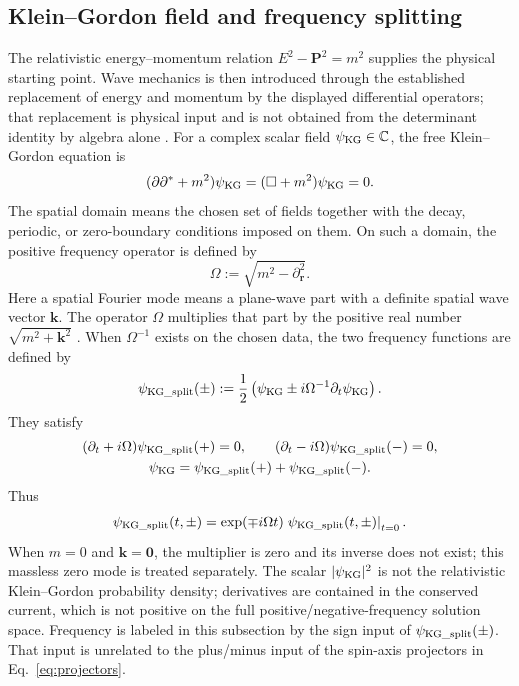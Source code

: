 \documentclass[10pt,letterpaper]{article}
\let\STAamsmathtext\text
\newcommand{\eqtext}[1]{\STAamsmathtext{\normalfont\rmfamily #1}}
\renewcommand{\text}[1]{\STAamsmathtext{\normalfont\rmfamily #1}}
\newcommand{\C}{\mathbb{C}}
\newcommand{\pv}[1]{#1}
\newcommand{\vct}[1]{\mathbf{#1}}
\newcommand{\delop}{\partial}
\newcommand{\delr}{\delop_{\vct{r}}}
\newcommand{\gradv}{\delr}
\newcommand{\conj}[1]{#1^{*}}
\begin{document}
\subsection{Klein--Gordon field and frequency splitting}
The relativistic energy--momentum relation
\(E^2-\vct{P}^2=m^2\) supplies the physical starting point. Wave mechanics is
then introduced through the established replacement of energy and momentum
by the displayed differential operators; that replacement is physical input
and is not obtained from the determinant identity by algebra alone
\cite{klein1926,gordon1926,greiner2000}. For a complex scalar field
\(\psi_{\eqtext{KG}}\in\C\), the free Klein--Gordon equation is
\begin{equation}
(\pv{\partial}\conj{\pv{\partial}}+m^2)\psi_{\eqtext{KG}}
=(\Box+m^2)\psi_{\eqtext{KG}}=0.
\label{eq:kg-free}
\end{equation}
The spatial domain means the chosen set of fields together with the decay,
periodic, or zero-boundary conditions imposed on them. On such a domain, the
positive frequency operator is defined by
\begin{equation}
\Omega:=\sqrt{m^2-\gradv^2}.
\label{eq:frequency-operator}
\end{equation}
Here a spatial Fourier mode means a plane-wave part with a definite spatial
wave vector \(\vct{k}\). The operator \(\Omega\) multiplies that part by the
positive real number \(\sqrt{m^2+\vct{k}^2}\)
\cite{greiner2000}. When \(\Omega^{-1}\) exists
on the chosen data,
the two frequency functions are defined by
\begin{equation}
\psi_{\eqtext{KG\_split}}(\pm)
:=\frac12\left(
\psi_{\eqtext{KG}}\pm
i\Omega^{-1}\partial_t\psi_{\eqtext{KG}}
\right).
\label{eq:frequency-functions}
\end{equation}
They satisfy
\begin{equation}
\begin{gathered}
(\partial_t+i\Omega)\psi_{\eqtext{KG\_split}}(+)=0,\qquad
(\partial_t-i\Omega)\psi_{\eqtext{KG\_split}}(-)=0,\\
\psi_{\eqtext{KG}}
=\psi_{\eqtext{KG\_split}}(+)+\psi_{\eqtext{KG\_split}}(-).
\end{gathered}
\label{eq:frequency-split}
\end{equation}
Thus
\[
\psi_{\eqtext{KG\_split}}(t,\pm)
=\exp(\mp i\Omega t)
\left.\psi_{\eqtext{KG\_split}}(t,\pm)\right|_{t=0}.
\]
When \(m=0\) and \(\vct{k}=\vct{0}\), the multiplier is zero and its inverse
does not exist; this massless zero mode is treated separately. The scalar
\(\lvert\psi_{\eqtext{KG}}\rvert^2\) is not the relativistic
Klein--Gordon probability density;
derivatives are contained in the conserved current, which is not positive on
the full positive/negative-frequency solution space.
Frequency is labeled in this subsection by the sign input of
\(\psi_{\eqtext{KG\_split}}(\pm)\). That input is unrelated to the
plus/minus input of the spin-axis projectors in Eq.\ \eqref{eq:projectors}.
\end{document}
